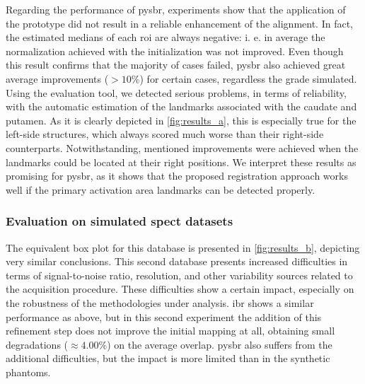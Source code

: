 \documentclass{frontiers}
\begin{document}
Regarding the performance of \gls*{pysbr}, experiments show that the application of the prototype
  did not result in a reliable enhancement of the alignment.
In fact, the estimated medians of each \gls*{roi} are always negative: i. e. in average
  the normalization achieved with the initialization was not improved.
Even though this result confirms that the majority of cases failed, \gls*{pysbr} also achieved
  great average improvements ($>10\%$) for certain cases, regardless the grade
  simulated.
Using the evaluation tool, we detected serious problems, in terms of reliability, with the automatic 
  estimation of the landmarks associated with the caudate and putamen.
As it is clearly depicted in \autoref{fig:results_a}, this is especially true for the left-side
  structures, which always scored much worse than their right-side counterparts.
Notwithstanding, mentioned improvements were achieved when the landmarks could be located at their 
  right positions.
We interpret these results as promising for \gls*{pysbr}, as it shows that the proposed registration 
  approach works well if the primary activation area landmarks can be detected properly.

\subsubsection{Evaluation on simulated \gls*{spect} datasets}
\label{sec:results_simulated}
The equivalent box plot for this database is presented in \autoref{fig:results_b},
  depicting very similar conclusions.
This second database presents increased difficulties in terms of signal-to-noise
  ratio, resolution, and other variability sources related to the acquisition procedure.
These difficulties show a certain impact, especially on the robustness of the
  methodologies under analysis.
\Gls*{ibr} shows a similar performance as above, but in this second experiment the addition
  of this refinement step does not improve the initial mapping at all, obtaining
  small degradations ($\approx4.00\%$) on the average overlap.
\Gls*{pysbr} also suffers from the additional difficulties, but the impact is
  more limited than in the synthetic phantoms.
\end{document}
